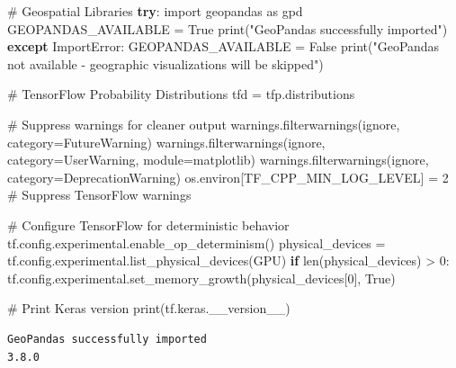 \documentclass[
  letterpaper,
  DIV=11,
  numbers=noendperiod]{scrreprt}
\newenvironment{Shaded}{\begin{snugshade}}{\end{snugshade}}
\newcommand{\BuiltInTok}[1]{\textcolor[rgb]{0.00,0.23,0.31}{#1}}
\newcommand{\CommentTok}[1]{\textcolor[rgb]{0.37,0.37,0.37}{#1}}
\newcommand{\ControlFlowTok}[1]{\textcolor[rgb]{0.00,0.23,0.31}{\textbf{#1}}}
\newcommand{\DecValTok}[1]{\textcolor[rgb]{0.68,0.00,0.00}{#1}}
\newcommand{\ImportTok}[1]{\textcolor[rgb]{0.00,0.46,0.62}{#1}}
\newcommand{\NormalTok}[1]{\textcolor[rgb]{0.00,0.23,0.31}{#1}}
\newcommand{\OperatorTok}[1]{\textcolor[rgb]{0.37,0.37,0.37}{#1}}
\newcommand{\PreprocessorTok}[1]{\textcolor[rgb]{0.68,0.00,0.00}{#1}}
\newcommand{\StringTok}[1]{\textcolor[rgb]{0.13,0.47,0.30}{#1}}
\newcommand{\VariableTok}[1]{\textcolor[rgb]{0.07,0.07,0.07}{#1}}
\begin{document}
\begin{Shaded}
\begin{Highlighting}[]
\CommentTok{\# Geospatial Libraries}
\ControlFlowTok{try}\NormalTok{:}
    \ImportTok{import}\NormalTok{ geopandas }\ImportTok{as}\NormalTok{ gpd}
\NormalTok{    GEOPANDAS\_AVAILABLE }\OperatorTok{=} \VariableTok{True}
    \BuiltInTok{print}\NormalTok{(}\StringTok{"GeoPandas successfully imported"}\NormalTok{)}
\ControlFlowTok{except} \PreprocessorTok{ImportError}\NormalTok{:}
\NormalTok{    GEOPANDAS\_AVAILABLE }\OperatorTok{=} \VariableTok{False}
    \BuiltInTok{print}\NormalTok{(}\StringTok{"GeoPandas not available {-} geographic visualizations will be skipped"}\NormalTok{)}

\CommentTok{\# TensorFlow Probability Distributions}
\NormalTok{tfd }\OperatorTok{=}\NormalTok{ tfp.distributions}

\CommentTok{\# Suppress warnings for cleaner output}
\NormalTok{warnings.filterwarnings(}\StringTok{\textquotesingle{}ignore\textquotesingle{}}\NormalTok{, category}\OperatorTok{=}\PreprocessorTok{FutureWarning}\NormalTok{)}
\NormalTok{warnings.filterwarnings(}\StringTok{\textquotesingle{}ignore\textquotesingle{}}\NormalTok{, category}\OperatorTok{=}\PreprocessorTok{UserWarning}\NormalTok{, module}\OperatorTok{=}\StringTok{\textquotesingle{}matplotlib\textquotesingle{}}\NormalTok{)}
\NormalTok{warnings.filterwarnings(}\StringTok{\textquotesingle{}ignore\textquotesingle{}}\NormalTok{, category}\OperatorTok{=}\PreprocessorTok{DeprecationWarning}\NormalTok{)}
\NormalTok{os.environ[}\StringTok{\textquotesingle{}TF\_CPP\_MIN\_LOG\_LEVEL\textquotesingle{}}\NormalTok{] }\OperatorTok{=} \StringTok{\textquotesingle{}2\textquotesingle{}}  \CommentTok{\# Suppress TensorFlow warnings}

\CommentTok{\# Configure TensorFlow for deterministic behavior}
\NormalTok{tf.config.experimental.enable\_op\_determinism()}
\NormalTok{physical\_devices }\OperatorTok{=}\NormalTok{ tf.config.experimental.list\_physical\_devices(}\StringTok{\textquotesingle{}GPU\textquotesingle{}}\NormalTok{)}
\ControlFlowTok{if} \BuiltInTok{len}\NormalTok{(physical\_devices) }\OperatorTok{\textgreater{}} \DecValTok{0}\NormalTok{:}
\NormalTok{    tf.config.experimental.set\_memory\_growth(physical\_devices[}\DecValTok{0}\NormalTok{], }\VariableTok{True}\NormalTok{)}

\CommentTok{\# Print Keras version}
\BuiltInTok{print}\NormalTok{(tf.keras.\_\_version\_\_)}
\end{Highlighting}
\end{Shaded}

\begin{verbatim}
GeoPandas successfully imported
3.8.0
\end{verbatim}
\end{document}
